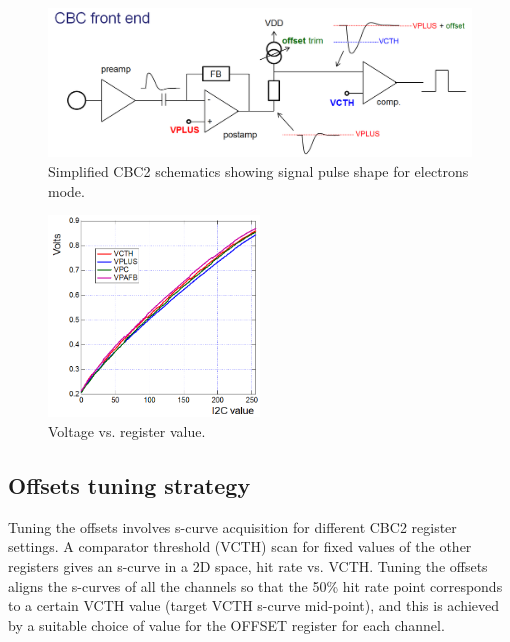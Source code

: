 \documentclass[11pt,a4paper]{article}
\begin{document}
	\begin{figure}[htbp]
	\centering
	\includegraphics[width=\textwidth]{fig/CBC.png}
	\caption{Simplified CBC2 schematics showing signal pulse shape for electrons mode. }\label{fig:CBC2}
	\end{figure}

	\begin{figure}[htbp]
	\centering
	\includegraphics[width=0.5\textwidth]{fig/VoltI2c.png}
	\caption{Voltage vs. register value. }\label{fig:volt-i2c}
	\end{figure}

	\subsection{Offsets tuning strategy}
	Tuning the offsets involves s-curve acquisition for different CBC2 register settings. 
	A comparator threshold (VCTH) scan for fixed values of the other registers gives an s-curve in a 2D space, hit rate vs. VCTH.
	Tuning the offsets aligns the s-curves of all the channels so that the 50\% hit rate point corresponds to
	a certain VCTH value (target VCTH s-curve mid-point), and this is achieved by a suitable choice of value for the OFFSET register for each channel.  
\end{document}
